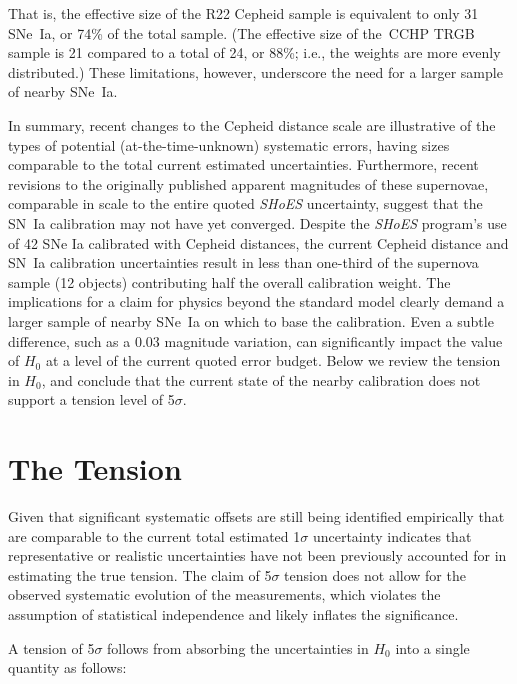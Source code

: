 \documentclass[12pt,modern]{aastex631}
\newcommand{\cchp}{\,CCHP\xspace}
\newcommand{\ho}{$H_{0}$\xspace}
\newcommand{\jwst}{\emph{JWST}\xspace}
\newcommand{\sne}{SNe~Ia\xspace}
\newcommand{\sn}{SN~Ia\xspace}
\newcommand{\shoes}{\emph{SHoES}\xspace}
\begin{document}
\noindent
That is, the effective size of the R22 Cepheid sample is equivalent to only 31 \sne, or 74\% of the total sample. (The effective size of the \cchp TRGB sample is 21 compared to a total of 24, or 88\%; i.e., the weights are more evenly distributed.) These limitations, however, underscore the need for a larger sample of nearby \sne. 


In summary, recent changes to  the Cepheid distance  scale are illustrative of the types of potential (at-the-time-unknown) systematic errors, having sizes comparable to the total current estimated uncertainties.    Furthermore, recent revisions to the originally published apparent magnitudes of these supernovae, comparable in scale to the entire quoted \shoes uncertainty, suggest that the \sn calibration may not have yet converged.   Despite the \shoes program's use of 42 SNe Ia calibrated with Cepheid distances, the current Cepheid distance and \sn calibration uncertainties  result in less than one-third of the supernova sample (12 objects) contributing half the overall calibration weight.  The implications for a claim for physics beyond the standard model clearly demand a larger sample of nearby \sne on which to base the calibration. Even a subtle difference, such as a 0.03 magnitude variation, can significantly impact the value of \ho at a level of the  current quoted error budget.  Below we review the tension in \ho, and conclude that the current state of the nearby calibration does not support a tension level of 5$\sigma$. 


\section{The Tension}
\label{sec:tension}


Given that significant systematic offsets are still being identified empirically that are comparable to the current total estimated  1$\sigma$ uncertainty indicates that representative or realistic uncertainties have not been previously accounted for in estimating the true tension.  The claim of 5$\sigma$ tension does not allow for the observed systematic evolution of the measurements, which violates the assumption of statistical independence and likely inflates the significance.

A tension of 5$\sigma$ follows from absorbing the uncertainties in \ho into a single quantity as follows: 
\end{document}
